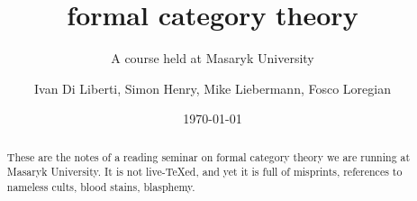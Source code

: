 \documentclass[a4paper,10pt]{amsart}
\author{
Ivan Di Liberti, 
Simon Henry, 
Mike Liebermann, 
Fosco Loregian
}
\title{formal category theory}
\subtitle{A course held at Masaryk University}
\date{\today}
\begin{document}
\maketitle
\begin{abstract}
  These are the notes of a reading seminar on formal category theory  we are
  running at Masaryk University. It is not live-{\TeX}ed, and yet it is full
  of misprints, references to nameless cults, blood stains, blasphemy.
\end{abstract}



{}

\hrulefill 
\end{document}
